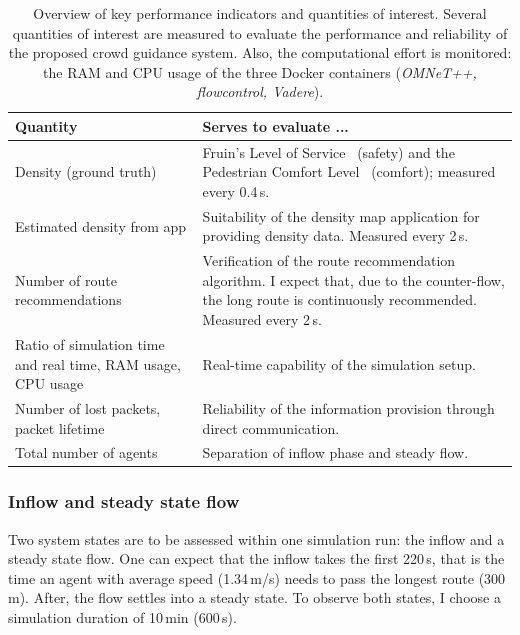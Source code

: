 \begin{table}[hbt!]
\begin{tabular}{|p{4cm}|p{10cm}|}
\hline 
\textbf{Quantity} &  \textbf{Serves to evaluate ...} \\ \hline
Density (ground truth) & Fruin's Level of Service~\cite{fruin-1971-cdyn} (safety) and the Pedestrian Comfort Level~\cite{tfl-2019-cdyn} (comfort); measured every 0.4\,s. \\ \hline
Estimated density from app  & Suitability of the density map application for providing density data. Measured every 2\,s. \\ \hline
Number of route recommendations  & Verification of the route recommendation algorithm. I expect that, due to the counter-flow, the long route is continuously recommended. Measured every 2\,s. \\ \hline
Ratio of simulation time and real time, RAM usage, CPU usage  & Real-time capability of the simulation setup. \\  \hline
Number of lost packets, packet lifetime  & Reliability of the information provision through direct communication. \\ \hline 
Total number of agents & Separation of inflow phase and steady flow. \\ \hline 
\end{tabular} 
\caption{Overview of key performance indicators and quantities of interest. Several quantities of interest are measured to evaluate the performance and reliability of the proposed crowd guidance system. Also, the computational effort is monitored: the RAM and CPU usage of the three Docker containers (\textit{OMNeT++, flowcontrol, Vadere}).}
\label{tab:measurementquants}
\end{table}



\subsubsection{Inflow and steady state flow}
Two system states are to be assessed within one simulation run: the inflow and a steady state flow. One can expect that the inflow takes the first 220\,s, that is the time an agent with average speed (1.34\,m/s) needs to pass the longest route (300\,m). After, the flow settles into a steady state. To observe both states, I choose a simulation duration of 10\,min (600\,s).  





